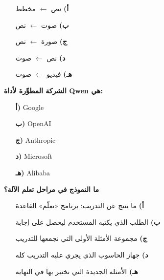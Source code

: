 \documentclass[11pt,a4paper]{article}
\begin{document}
\begin{multicols}{2}
\begin{minipage}{\linewidth}
\begin{itemize}[leftmargin=0.95cm, labelsep=4pt, itemsep=0pt, topsep=2pt, parsep=0pt]
  \item[\textbf{أ)}] نص $\leftarrow$ مخطط
  \item[\textbf{ب)}] صوت $\leftarrow$ نص
  \item[\textbf{ج)}] صورة $\leftarrow$ نص
  \item[\textbf{د)}] نص $\leftarrow$ صوت
  \item[\textbf{هـ)}] فيديو $\leftarrow$ صوت
\end{itemize}
\end{minipage}\par\vspace{7pt plus 4pt}
\noindent\begin{minipage}{\linewidth}
\hangindent=0.7cm\textbf{الشركة المطوِّرة لأداة \textenglish{Qwen} هي:}
\begin{itemize}[leftmargin=0.95cm, labelsep=4pt, itemsep=0pt, topsep=2pt, parsep=0pt]
  \item[\textbf{أ)}] \textenglish{Google}
  \item[\textbf{ب)}] \textenglish{OpenAI}
  \item[\textbf{ج)}] \textenglish{Anthropic}
  \item[\textbf{د)}] \textenglish{Microsoft}
  \item[\textbf{هـ)}] \textenglish{Alibaba}
\end{itemize}
\end{minipage}\par\vspace{7pt plus 4pt}
\noindent\begin{minipage}{\linewidth}
\hangindent=0.7cm\textbf{ما النموذج في مراحل تعلم الآلة؟}
\begin{itemize}[leftmargin=0.95cm, labelsep=4pt, itemsep=0pt, topsep=2pt, parsep=0pt]
  \item[\textbf{أ)}] ما ينتج عن التدريب: برنامج «تعلّم» القاعدة
  \item[\textbf{ب)}] الطلب الذي يكتبه المستخدم ليحصل على إجابة
  \item[\textbf{ج)}] مجموعة الأمثلة الأولى التي نجمعها للتدريب
  \item[\textbf{د)}] جهاز الحاسوب الذي يجري عليه التدريب كله
  \item[\textbf{هـ)}] الأمثلة الجديدة التي نختبر بها في النهاية
\end{itemize}
\end{minipage}\par\vspace{7pt plus 4pt}

\end{multicols}
\end{document}
